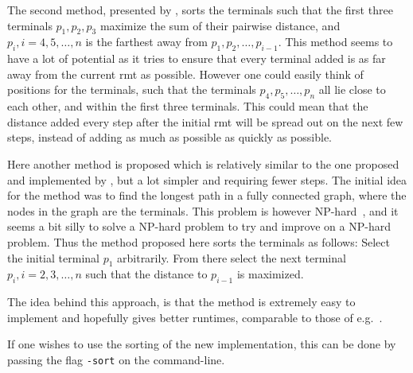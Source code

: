 The second method, presented by \textcite{fonseca2014}, sorts the terminals such
that the first three terminals $p_1, p_2, p_3$ maximize the sum of their
pairwise distance, and $p_i, i = 4, 5, \ldots, n$ is the farthest away from
$p_1, p_2, \ldots, p_{i-1}$. This method seems to have a lot of potential as it
tries to ensure that every terminal added is as far away from the current
\ac{rmt} as possible. However one could easily think of positions for the
terminals, such that the terminals $p_4, p_5, \ldots, p_n$ all lie close to each
other, and within the first three terminals. This could mean that the distance
added every step after the initial \ac{rmt} will be spread out on the next few
steps, instead of adding as much as possible as quickly as possible.

Here another method is proposed which is relatively similar to the one proposed
and implemented by \textcite{fonseca2014}, but a lot simpler and requiring fewer
steps. The initial idea for the method was to find the longest path in a fully
connected graph, where the nodes in the graph are the terminals. This problem is
however NP-hard~\cite{longestpathproblem}, and it seems a bit silly to solve a
NP-hard problem to try and improve on a NP-hard problem. Thus the method
proposed here sorts the terminals as follows: Select the initial terminal $p_1$
arbitrarily. From there select the next terminal $p_i, i = 2, 3, \ldots, n$ such
that the distance to $p_{i-1}$ is maximized.

The idea behind this approach, is that the method is extremely easy to implement
and hopefully gives better runtimes, comparable to those of e.g.\
\textcite{fonseca2014}.

If one wishes to use the sorting of the new implementation, this can be done by
passing the flag \texttt{-sort} on the command-line.

